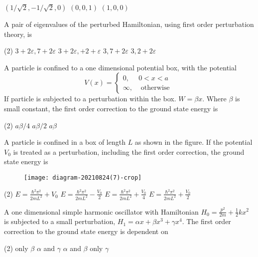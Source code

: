 \begin{enumerate}
\begin{tasks}
	\task[\textbf{B.}]$(1 / \sqrt{2},-1 / \sqrt{2}, 0)$
	\task[\textbf{C.}] $(0,0,1)$
	\task[\textbf{D.}]$(1,0,0)$
\end{tasks}
\begin{minipage}{\textwidth}
	\item A pair of eigenvalues of the perturbed Hamiltonian, using first order perturbation theory, is
\end{minipage}
\begin{tasks}(2)
	\task[\textbf{A.}]$3+2 \varepsilon, 7+2 \varepsilon$
	\task[\textbf{B.}]$3+2 \varepsilon,+2+\varepsilon$
	\task[\textbf{C.}]$3,7+2 \varepsilon$
	\task[\textbf{D.}]$3,2+2 \varepsilon$
\end{tasks}
\begin{minipage}{\textwidth}
	\item A particle is confined to a one dimensional potential box, with the potential
	$$
	V(x)= \begin{cases}0, & 0<x<a \\ \infty, & \text { otherwise }\end{cases}
	$$
	If particle is subjected to a perturbation within the box. $W=\beta x$. Where $\beta$ is small constant, the first order correction to the ground state energy is
\end{minipage}
\begin{tasks}(2)
	\task[\textbf{B.}]$a \beta / 4$
	\task[\textbf{C.}]$a \beta / 2$
	\task[\textbf{D.}] $a \beta$
\end{tasks}
\begin{minipage}{\textwidth}
	\item A particle is confined in a box of length $L$ as shown in the figure. If the potential $V_{0}$ is treated as a perturbation, including the first order correction, the ground state energy is
	\begin{figure}[H]
		\centering
		\texttt{[image: diagram-20210824(7)-crop]}
	\end{figure}
\end{minipage}
\begin{tasks}(2)
	\task[\textbf{A.}] $E=\frac{\hbar^{2} \pi^{2}}{2 m L^{2}}+V_{0}$
	\task[\textbf{B.}]$E=\frac{\hbar^{2} \pi^{2}}{2 m L^{2}}-\frac{V_{0}}{2}$
	\task[\textbf{C.}] $E=\frac{\hbar^{2} \pi^{2}}{2 m L^{2}}+\frac{V_{0}}{4}$
	\task[\textbf{D.}]$E=\frac{\hbar^{2} \pi^{2}}{2 m L^{2}}+\frac{V_{0}}{2}$
\end{tasks}
\begin{minipage}{\textwidth}
	\item A one dimensional simple harmonic oscillator with Hamiltonian $H_{0}=\frac{p^{2}}{2 m}+\frac{1}{2} k x^{2}$ is subjected to a small perturbation, $H_{1}=\alpha x+\beta x^{3}+\gamma x^{4}$. The first order correction to the ground state energy is dependent on
\end{minipage}
\begin{tasks}(2)
	\task[\textbf{A.}] only $\beta$
	\task[\textbf{B.}]$\alpha$ and $\gamma$
	\task[\textbf{C.}]$\alpha$ and $\beta$
	\task[\textbf{D.}]only $\gamma$
\end{tasks}
  \end{enumerate}
